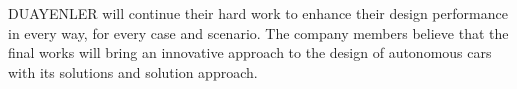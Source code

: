 \documentclass[a4paper,12pt]{article}
\begin{document}
DUAYENLER will continue their hard work to enhance their design performance in every way, for every case and scenario. The company members believe that the final works will bring an innovative approach to the design of autonomous cars with its solutions and solution approach. 

\newpage


\begin{appendices}








\end{appendices}
\end{document}
